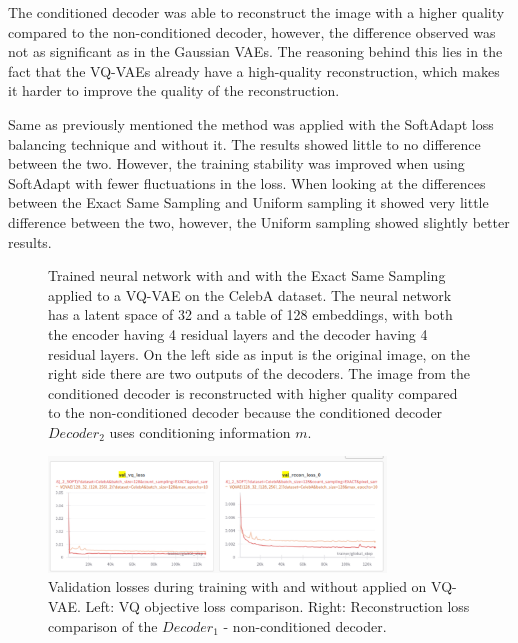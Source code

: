 The conditioned decoder was able to reconstruct the image with a higher quality compared to the non-conditioned decoder, however, the difference observed was not as significant as in the Gaussian VAEs. The reasoning behind this lies in the fact that the VQ-VAEs already have a high-quality reconstruction, which makes it harder to improve the quality of the reconstruction.

Same as previously mentioned the method was applied with the SoftAdapt loss balancing technique and without it. The results showed little to no difference between the two. However, the training stability was improved when using SoftAdapt with fewer fluctuations in the loss. When looking at the differences between the Exact Same Sampling and Uniform sampling it showed very little difference between the two, however, the Uniform sampling showed slightly better results.

\begin{figure}[H]
    \centering
    
    \caption[Trained neural network with  applied to a VQ-VAE.]
    {
        Trained neural network with  and with the Exact Same Sampling applied to a VQ-VAE on the CelebA dataset. The neural network has a latent space of 32 and a table of 128 embeddings, with both the encoder having 4 residual layers and the decoder having 4 residual layers.
        On the left side as input is the original image, on the right side there are two outputs of the decoders. 
        The image from the conditioned decoder is reconstructed with higher quality compared to the non-conditioned decoder because the conditioned decoder $Decoder_2$ uses conditioning information $m$.
    }
    \label{fig:res_val_vqvae}
\end{figure}

\begin{figure}[H]
    \centering
    \includegraphics[width=0.8\textwidth]{figures/results/VQ+RECON.png}
    \caption[Validation loss comparison during training of a Gaussian VAE.]
    {
        Validation losses during training with and without  applied on VQ-VAE.
        Left: VQ objective loss comparison. Right: Reconstruction loss comparison of the $Decoder_1$ - non-conditioned decoder.
    }
    \label{fig:results_method1_vq_vae}
\end{figure}

